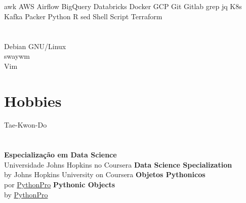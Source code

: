 \documentclass[]{friggeri-cv}
\begin{document}
%
%
\newpage
{}%
%
%
\begin{aside}
%
%
%
  \section{}
    awk
    AWS
    Airflow
    BigQuery
    Databricks
    Docker
    GCP
    Git
    Gitlab
    grep
    jq
    K8s
    Kafka
    Packer
    Python
    R
    sed
    Shell Script
    Terraform
%
  \section{}
    Debian GNU/Linux \\%
    swaywm \\%
    Vim
%
  \section{Hobbies}
      \href{https://olhares.com/diraol}{}
      Tae-Kwon-Do
%
  \section{}
      {\textbf{Especialização em Data Science}\\{\scriptsize{Universidade Johns Hopkins no Coursera}}}%
      {\textbf{Data Science Specialization}\\{\scriptsize{by Johns Hopkins University on Coursera}}}
%
      {\textbf{Objetos Pythonicos}\\{\scriptsize{por \href{https://www.python.pro.br/modulos/}{PythonPro}}}}%
      {\textbf{Pythonic Objects}\\{\scriptsize{by \href{https://www.python.pro.br/modulos/}{PythonPro}}}}
\end{aside}
\end{document}
